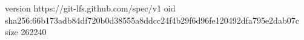 version https://git-lfs.github.com/spec/v1
oid sha256:66b173adb84df720b0d38555a8ddcc24f4b29f6d96fe120492dfa795e2dab07c
size 262240
